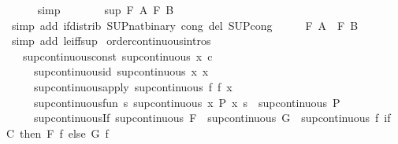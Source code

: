 \begin{isabellebody}
\ \ \ \ \isamarkupfalse%
\ simp\isanewline
\ \ \isamarkupfalse%
\ \isamarkupfalse%
\ {\isachardoublequoteopen}{\isasymdots}\ {\isacharequal}\ sup\ {\isacharparenleft}F\ A{\isacharparenright}\ {\isacharparenleft}F\ B{\isacharparenright}{\isachardoublequoteclose}\isanewline
\ \ \ \ \isamarkupfalse%
\ {\isacharasterisk}\ \isamarkupfalse%
\ {\isacharparenleft}simp\ add{\isacharcolon}\ if{\isacharunderscore}distrib\ SUP{\isacharunderscore}nat{\isacharunderscore}binary\ cong\ del{\isacharcolon}\ SUP{\isacharunderscore}cong{\isacharparenright}\isanewline
\ \ \isamarkupfalse%
\ \isamarkupfalse%
\ {\isachardoublequoteopen}F\ A\ {\isasymle}\ F\ B{\isachardoublequoteclose}\isanewline
\ \ \ \ \isamarkupfalse%
\ {\isacharparenleft}simp\ add{\isacharcolon}\ le{\isacharunderscore}iff{\isacharunderscore}sup{\isacharparenright}\isanewline
{}\isamarkupfalse%
%
\endisatagproof
{\isafoldproof}%
%
\isadelimproof
\isanewline
%
\endisadelimproof
\isanewline
{}\isamarkupfalse%
\ {\isacharbrackleft}order{\isacharunderscore}continuous{\isacharunderscore}intros{\isacharbrackright}{\isacharcolon}\isanewline
\ \ \ sup{\isacharunderscore}continuous{\isacharunderscore}const{\isacharcolon}\ {\isachardoublequoteopen}sup{\isacharunderscore}continuous\ {\isacharparenleft}{\isasymlambda}x{\isachardot}\ c{\isacharparenright}{\isachardoublequoteclose}\isanewline
\ \ \ \ \ sup{\isacharunderscore}continuous{\isacharunderscore}id{\isacharcolon}\ {\isachardoublequoteopen}sup{\isacharunderscore}continuous\ {\isacharparenleft}{\isasymlambda}x{\isachardot}\ x{\isacharparenright}{\isachardoublequoteclose}\isanewline
\ \ \ \ \ sup{\isacharunderscore}continuous{\isacharunderscore}apply{\isacharcolon}\ {\isachardoublequoteopen}sup{\isacharunderscore}continuous\ {\isacharparenleft}{\isasymlambda}f{\isachardot}\ f\ x{\isacharparenright}{\isachardoublequoteclose}\isanewline
\ \ \ \ \ sup{\isacharunderscore}continuous{\isacharunderscore}fun{\isacharcolon}\ {\isachardoublequoteopen}{\isacharparenleft}{\isasymAnd}s{\isachardot}\ sup{\isacharunderscore}continuous\ {\isacharparenleft}{\isasymlambda}x{\isachardot}\ P\ x\ s{\isacharparenright}{\isacharparenright}\ {\isasymLongrightarrow}\ sup{\isacharunderscore}continuous\ P{\isachardoublequoteclose}\isanewline
\ \ \ \ \ sup{\isacharunderscore}continuous{\isacharunderscore}If{\isacharcolon}\ {\isachardoublequoteopen}sup{\isacharunderscore}continuous\ F\ {\isasymLongrightarrow}\ sup{\isacharunderscore}continuous\ G\ {\isasymLongrightarrow}\ sup{\isacharunderscore}continuous\ {\isacharparenleft}{\isasymlambda}f{\isachardot}\ if\ C\ then\ F\ f\ else\ G\ f{\isacharparenright}{\isachardoublequoteclose}\isanewline

\end{isabellebody}
